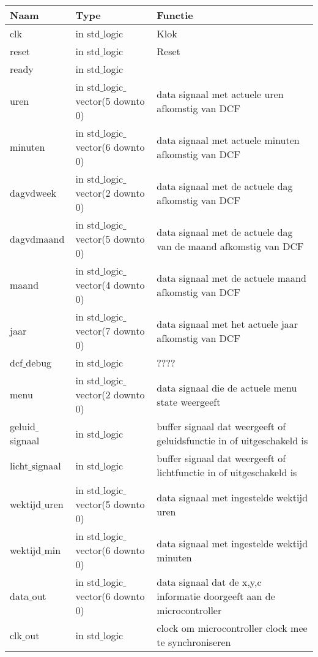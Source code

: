 \begin{center}
\label{table:uitgangen}
\begin{tabular}{| l | l | p{4.5cm} |}
\hline
\textbf{Naam} & \textbf{Type} & \textbf{Functie} \\ \hline
clk           				& in std$\_$logic           									& Klok             \\ \hline
reset         			& in std$\_$logic           									& Reset            \\ \hline
ready					& in std$\_$logic 											&  \\ \hline
uren						&in std$\_$logic$\_$vector(5 downto 0) 		&data signaal met actuele uren afkomstig van DCF \\ \hline
minuten				&in std$\_$logic$\_$vector(6 downto 0) 		&data signaal met actuele minuten afkomstig van DCF \\ \hline
dagvdweek			&in std$\_$logic$\_$vector(2 downto 0)			&data signaal met de actuele dag afkomstig van DCF\\ \hline
dagvdmaand		&in std$\_$logic$\_$vector(5 downto 0) 		&data signaal met de actuele dag van de maand afkomstig van DCF \\ \hline
maand					&in std$\_$logic$\_$vector(4 downto 0) 		&data signaal met de actuele maand afkomstig van DCF  \\ \hline
jaar						&in std$\_$logic$\_$vector(7 downto 0)	 		&data signaal met het actuele jaar afkomstig van DCF  \\ \hline
dcf$\_$debug		&in std$\_$logic 												& ????  \\ \hline
menu					&in std$\_$logic$\_$vector(2 downto 0)			&data signaal die de actuele menu state weergeeft \\ \hline
geluid$\_$signaal 		&in std$\_$logic 		 										&buffer signaal dat weergeeft of geluidsfunctie in of uitgeschakeld is \\ \hline
licht$\_$signaal 	&in std$\_$logic 		 										&buffer signaal dat weergeeft of lichtfunctie in of uitgeschakeld is  \\ \hline 
wektijd$\_$uren 	& in std$\_$logic$\_$vector(5 downto 0)		&data signaal met ingestelde wektijd uren \\ \hline 
wektijd$\_$min 	&in std$\_$logic$\_$vector(6 downto 0) 		&data signaal met ingestelde wektijd minuten \\ \hline 
data$\_$out 		&in std$\_$logic$\_$vector(6 downto 0) 		&data signaal dat de x,y,c informatie doorgeeft aan de microcontroller \\ \hline 
clk$\_$out 			&in std$\_$logic 		 										&clock om microcontroller clock mee te synchroniseren \\ \hline 


\end{tabular}
\end{center}


